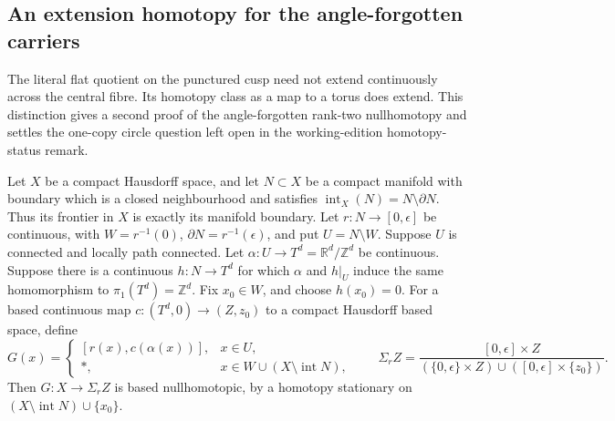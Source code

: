 \subsection{An extension homotopy for the angle-forgotten carriers}
\label{mapsIII:carrier-extension-section}

The literal flat quotient on the punctured cusp need not extend
continuously across the central fibre. Its homotopy class as a map to a
torus does extend. This distinction gives a second proof of the
angle-forgotten rank-two nullhomotopy and settles the one-copy circle
question left open in the working-edition homotopy-status remark.

\begin{lemma}
\label{mapsIII:carrier-extension-lemma}
Let $X$ be a compact Hausdorff space, and let $N\subset X$ be a compact
manifold with boundary which is a closed neighbourhood and satisfies
$\operatorname{int}_X(N)=N\setminus\partial N$.
Thus its frontier in $X$ is exactly its manifold boundary.
Let $r:N\to[0,\epsilon]$ be continuous, with
$W=r^{-1}(0)$, $\partial N=r^{-1}(\epsilon)$, and put
$U=N\setminus W$. Suppose $U$ is connected and locally path connected.
Let $\alpha:U\to T^d=\mathbb R^d/\mathbb Z^d$ be continuous.
Suppose there is a continuous $h:N\to T^d$ for which
$\alpha$ and $h|_U$ induce the same homomorphism to
$\pi_1(T^d)=\mathbb Z^d$. Fix $x_0\in W$, and choose $h(x_0)=0$.
For a based continuous map $c:(T^d,0)\to(Z,z_0)$ to a compact
Hausdorff based space, define
\[
 G(x)=
 \begin{cases}
 [r(x),c(\alpha(x))],&x\in U,\\
 *,&x\in W\cup(X\setminus\operatorname{int}N),
 \end{cases}
 \qquad
 \Sigma_r Z=
 \frac{[0,\epsilon]\times Z}
 {(\{0,\epsilon\}\times Z)\cup([0,\epsilon]\times\{z_0\})}.
\]
Then $G:X\to\Sigma_rZ$ is based nullhomotopic, by a homotopy
stationary on $(X\setminus\operatorname{int}N)\cup\{x_0\}$.
\end{lemma}

